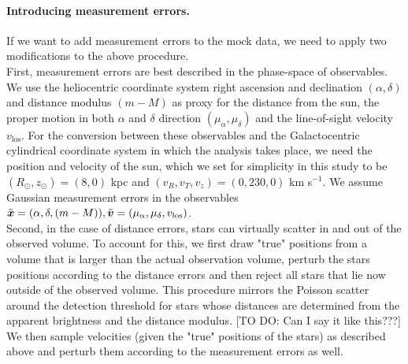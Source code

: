 \paragraph{Introducing measurement errors.} If we want to add measurement errors to the mock data, we need to apply two modifications to the above procedure.
\\First, measurement errors are best described in the phase-space of observables. We use the heliocentric coordinate system right ascension and declination $(\alpha,\delta)$ and distance modulus $(m-M)$ as proxy for the distance from the sun, the proper motion in both $\alpha$ and $\delta$ direction $(\mu_\alpha,\mu_\delta)$ and the line-of-sight velocity $v_\text{los}$. For the conversion between these observables and the Galactocentric cylindrical coordinate system in which the analysis takes place, we need the position and velocity of the sun, which we set for simplicity in this study to be $(R_\odot,z_\odot)=(8,0)$ kpc and $(v_R,v_T,v_z)=(0,230,0)$ km s$^{-1}$. We assume Gaussian measurement errors in the observables $\tilde{\boldsymbol{x}} = (\alpha,\delta,(m-M)), \tilde{\boldsymbol{v}} = (\mu_\alpha,\mu_\delta,v_\text{los})$.
\\Second, in the case of distance errors, stars can virtually scatter in and out of the observed volume. To account for this, we first draw "true" positions from a volume that is larger than the actual observation volume, perturb the stars positions according to the distance errors and then reject all stars that lie now outside of the observed volume. This procedure mirrors the Poisson scatter around the detection threshold for stars whose distances are determined from the apparent brightness and the distance modulus. [TO DO: Can I say it like this???] We then sample velocities (given the "true" positions of the stars) as described above and perturb them according to the measurement errors as well.

